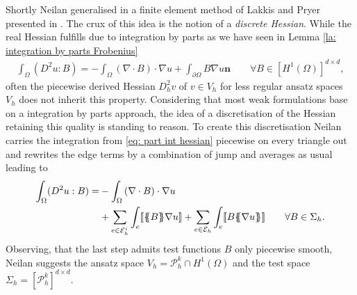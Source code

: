 Shortly Neilan generalised in \cite{Neilan2014} a finite element method of Lakkis and Pryer presented in \cite{LP2011}.
The crux of this idea is the notion of a \emph{discrete Hessian}. 
While the real Hessian fulfills due to integration by parts as we have seen in Lemma \ref{la: integration by parts Frobenius}
	\begin{align}
		\int_\Omega (D^2 u : B) = - \int_\Omega \left(\nabla \cdot B\right) \cdot \nabla u + \int_{\partial \Omega}  B \nabla u \mathbf {n} \qquad \forall B \in [H^1(\Omega)]^{d \times d}, \label{eq: part int hessian}
	\end{align}
often the piecewise derived Hessian $D_h^2 v$ of $ v \in V_h$ for less regular ansatz spaces $V_h$ does not inherit this property. Considering that most weak formulations base on a integration by parts approach, the idea of a discretisation of the Hessian retaining this quality is standing to reason. To create this discretisation Neilan carries the integration from \eqref{eq: part int hessian} piecewise on every triangle out and rewrites the edge terms by a combination of jump and averages as usual leading to
	\begin{align}
		\begin{split}
		\int_\Omega (D^2 u : B) 
		=& - \int_\Omega \left(\nabla \cdot B\right) \cdot \nabla u \\
		&+ \sum_{ e \in \edgesi} \int_e  \jump {\average B \nabla u }
				+ \sum_{ e \in \edges} \int_e  \jump{B \average {\nabla u} }  \qquad \forall B \in \Sigma_h. \label{eq: part int hessian omega}
		\end{split}
	\end{align}
Observing, that the last step admits test functions $B$ only piecewise smooth, Neilan suggests the ansatz space $V_h = \mathcal{P}_h^k \cap H^1(\Omega)$ and the test space $\Sigma_h = [\mathcal{P}_h^k]^{d \times d}$.

